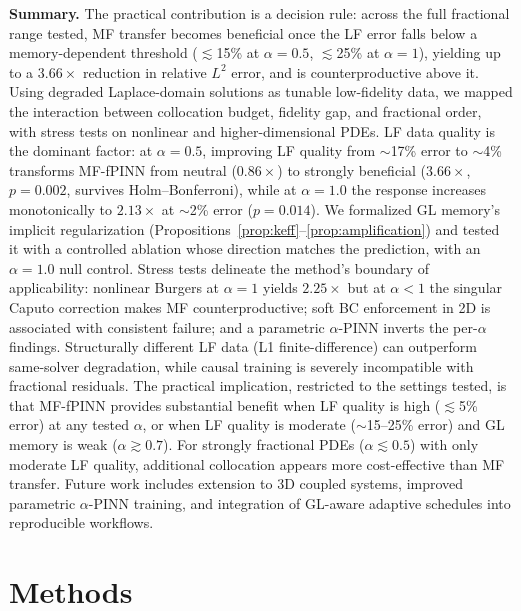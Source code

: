 \documentclass[11pt]{article}
\begin{document}
\textbf{Summary.} The practical contribution is a decision rule: across the full fractional range tested, MF transfer becomes beneficial once the LF error falls below a memory-dependent threshold ($\lesssim$15\% at $\alpha = 0.5$, $\lesssim$25\% at $\alpha = 1$), yielding up to a $3.66\times$ reduction in relative $L^2$ error, and is counterproductive above it. Using degraded Laplace-domain solutions as tunable low-fidelity data, we mapped the interaction between collocation budget, fidelity gap, and fractional order, with stress tests on nonlinear and higher-dimensional PDEs. LF data quality is the dominant factor: at $\alpha = 0.5$, improving LF quality from $\sim$17\% error to $\sim$4\% transforms MF-fPINN from neutral ($0.86\times$) to strongly beneficial ($3.66\times$, $p = 0.002$, survives Holm--Bonferroni), while at $\alpha = 1.0$ the response increases monotonically to $2.13\times$ at $\sim$2\% error ($p = 0.014$). We formalized GL memory's implicit regularization (Propositions~\ref{prop:keff}--\ref{prop:amplification}) and tested it with a controlled ablation whose direction matches the prediction, with an $\alpha = 1.0$ null control. Stress tests delineate the method's boundary of applicability: nonlinear Burgers at $\alpha = 1$ yields $2.25\times$ but at $\alpha < 1$ the singular Caputo correction makes MF counterproductive; soft BC enforcement in 2D is associated with consistent failure; and a parametric $\alpha$-PINN inverts the per-$\alpha$ findings. Structurally different LF data (L1 finite-difference) can outperform same-solver degradation, while causal training is severely incompatible with fractional residuals. The practical implication, restricted to the settings tested, is that MF-fPINN provides substantial benefit when LF quality is high ($\lesssim$5\% error) at any tested $\alpha$, or when LF quality is moderate ($\sim$15--25\% error) and GL memory is weak ($\alpha \gtrsim 0.7$). For strongly fractional PDEs ($\alpha \lesssim 0.5$) with only moderate LF quality, additional collocation appears more cost-effective than MF transfer. Future work includes extension to 3D coupled systems, improved parametric $\alpha$-PINN training, and integration of GL-aware adaptive schedules into reproducible workflows.

\section{Methods}
\label{sec:methods}
\end{document}
